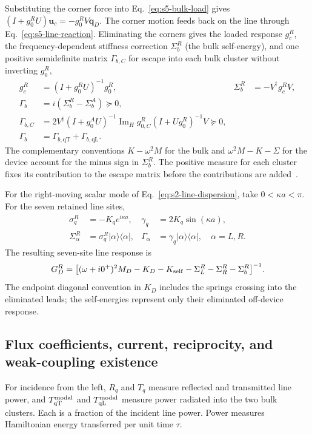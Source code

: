 \documentclass[10pt,aps,onecolumn,floatfix,notitlepage,nofootinbib,showkeys]{revtex4-2}
\newcommand{\vu}{\bm{u}}
\newcommand{\vq}{\bm{q}}
\newcommand{\qT}{\mathrm{qT}}
\newcommand{\qL}{\mathrm{qL}}
\newcommand{\ImH}{\operatorname{Im}_{\!H}}
\begin{document}
Substituting the corner force into Eq.~\eqref{eq:s5-bulk-load} gives $(I+g_0^RU)\vu_c=-g_0^RV\vq_D$. The corner motion feeds back on the line through Eq.~\eqref{eq:s5-line-reaction}. Eliminating the corners gives the loaded response $g_c^R$, the frequency-dependent stiffness correction $\Sigma_b^R$ (the bulk self-energy), and one positive semidefinite matrix $\Gamma_{b,C}$ for escape into each bulk cluster without inverting $g_0^R$,
\begin{align}
 g_c^R&=(I+g_0^RU)^{-1}g_0^R,
 &\Sigma_b^R&=-V^\dagger g_c^RV,
 \label{eq:s5-dressed-core}\\
 \Gamma_b&=i(\Sigma_b^R-\Sigma_b^A)\succeq0,\\
 \Gamma_{b,C}&=2V^\dagger(I+g_0^AU)^{-1}\ImH g_{0,C}^R(I+Ug_0^R)^{-1}V\succeq0,
 \label{eq:s5-cluster-linewidth}\\
 \Gamma_b&=\Gamma_{b,\qT}+\Gamma_{b,\qL}.
\end{align}
The complementary conventions $K-\omega^2M$ for the bulk and $\omega^2M-K-\Sigma$ for the device account for the minus sign in $\Sigma_b^R$.  The positive measure for each cluster fixes its contribution to the escape matrix before the contributions are added~\cite{Boumrar2025}.

For the right-moving scalar mode of Eq.~\eqref{eq:s2-line-dispersion}, take $0<\kappa a<\pi$. For the seven retained line sites,
\begin{align}
 \sigma_q^R&=-K_qe^{i\kappa a},
 &\gamma_q&=2K_q\sin(\kappa a),\\
 \Sigma_\alpha^R&=\sigma_q^R|\alpha\rangle\langle\alpha|,
 &\Gamma_\alpha&=\gamma_q|\alpha\rangle\langle\alpha|,
 \quad\alpha=L,R.
 \label{eq:s5-leads}
\end{align}
The resulting seven-site line response is
\begin{equation}
 G_D^R=\big[(\omega+i0^+)^2M_D-K_D-K_{\rm self}-\Sigma_L^R-\Sigma_R^R-\Sigma_b^R\big]^{-1}.
 \label{eq:deviceGreen}
\end{equation}
The endpoint diagonal convention in $K_D$ includes the springs crossing into the eliminated leads; the self-energies represent only their eliminated off-device response.

\subsection{Flux coefficients, current, reciprocity, and weak-coupling existence}
\label{sec:s5-flux}

For incidence from the left, $R_q$ and $T_q$ measure reflected and transmitted line power, and $T_{\qT}^{\rm modal}$ and $T_{\qL}^{\rm modal}$ measure power radiated into the two bulk clusters. Each is a fraction of the incident line power. Power measures Hamiltonian energy transferred per unit time $\tau$.
\end{document}
